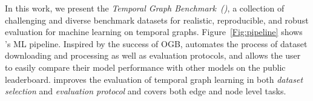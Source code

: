 


In this work, we present the \emph{Temporal Graph Benchmark~(\name)}, a collection of challenging and diverse benchmark datasets for realistic, reproducible, and robust evaluation for machine learning on temporal graphs. Figure~\ref{Fig:pipeline} shows \name's ML pipeline. Inspired by the success of OGB, \name automates the process of dataset downloading and processing as well as evaluation protocols, and allows the user to easily compare their model performance with other models on the public leaderboard. \name improves the evaluation of temporal graph learning in both \emph{dataset selection} and \emph{evaluation protocol} and covers both edge and node level tasks.






